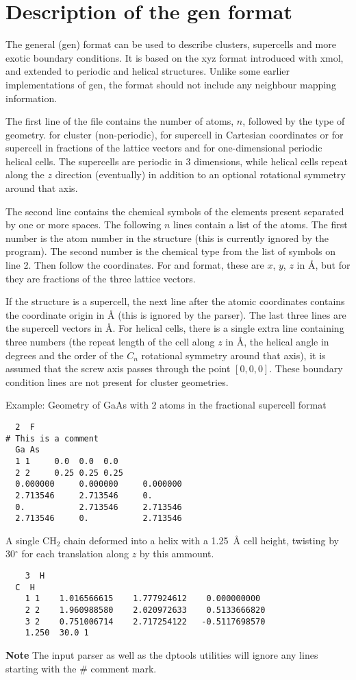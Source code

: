 
\chapter{Description of the gen format}
\label{app:gen}

The general (gen) format can be used to describe clusters, supercells and more
exotic boundary conditions. It is based on the xyz format introduced with xmol,
and extended to periodic and helical structures. Unlike some earlier
implementations of gen, the format should not include any neighbour mapping
information.

The first line of the file contains the number of atoms, $n$, followed by the
type of geometry.  for cluster (non-periodic),  for supercell in
Cartesian coordinates or  for supercell in fractions of the lattice
vectors and  for one-dimensional periodic helical cells. The supercells
are periodic in 3 dimensions, while helical cells repeat along the $z$ direction
(eventually) in addition to an optional rotational symmetry around that axis.

The second line contains the chemical symbols of the elements present
separated by one or more spaces.  The following $n$ lines contain a
list of the atoms. The first number is the atom number in the
structure (this is currently ignored by the program). The second
number is the chemical type from the list of symbols on line 2. Then
follow the coordinates. For  and  format, these are $x$,
$y$, $z$ in {\AA}, but for  they are fractions of the three
lattice vectors.

If the structure is a supercell, the next line after the atomic
coordinates contains the coordinate origin in {\AA} (this is ignored
by the parser). The last three lines are the supercell vectors in
{\AA}. For helical cells, there is a single extra line containing
three numbers (the repeat length of the cell along $z$ in {\AA}, the
helical angle in degrees and the order of the $C_n$ rotational
symmetry around that axis), it is assumed that the screw axis passes
through the point $[0,0,0]$. These boundary condition lines are not
present for cluster geometries.

Example: Geometry of GaAs with 2 atoms in the fractional supercell
format
\begin{verbatim}
  2  F
# This is a comment
  Ga As
  1 1     0.0  0.0  0.0
  2 2     0.25 0.25 0.25
  0.000000     0.000000     0.000000
  2.713546     2.713546     0.      
  0.           2.713546     2.713546
  2.713546     0.           2.713546
\end{verbatim}

A single CH$_2$ chain deformed into a helix with a 1.25~{\AA} cell
height, twisting by 30$^\circ$ for each translation along $z$ by this
ammount.
\begin{verbatim}
    3  H
  C  H
    1 1    1.016566615    1.777924612    0.000000000
    2 2    1.960988580    2.020972633    0.5133666820
    3 2    0.751006714    2.717254122   -0.5117698570
    1.250  30.0 1
\end{verbatim}

{\bf Note} The \dftbp{} input parser as well as the dptools utilities will
ignore any lines starting with the \# comment mark.
